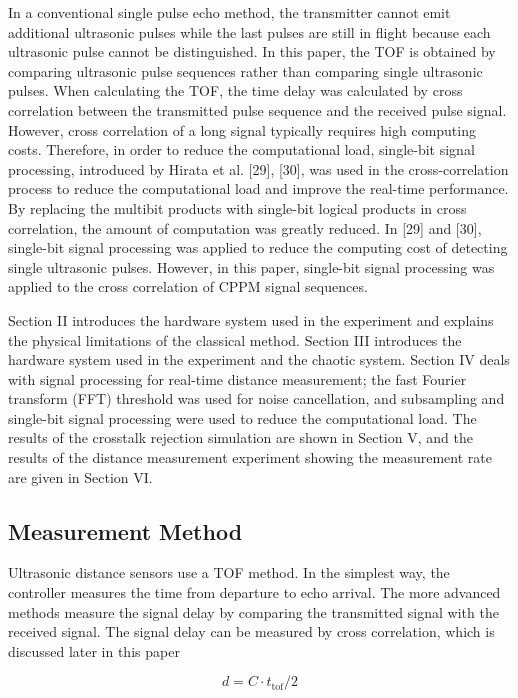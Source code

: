 In a conventional single pulse echo method, the transmitter cannot emit additional ultrasonic pulses while the last pulses are still in flight because each ultrasonic pulse cannot be distinguished. In this paper, the TOF is obtained by comparing ultrasonic pulse sequences rather than comparing single ultrasonic pulses. When calculating the TOF, the time delay was calculated by cross correlation between the transmitted pulse sequence and the received pulse signal. However, cross correlation of a long signal typically requires high computing costs. Therefore, in order to reduce the computational load, single-bit signal processing, introduced by Hirata et al. [29], [30], was used in the cross-correlation process to reduce the computational load and improve the real-time performance. By replacing the multibit products with single-bit logical products in cross correlation, the amount of computation was greatly reduced. In [29] and [30], single-bit signal processing was applied to reduce the computing cost of detecting single ultrasonic pulses. However, in this paper, single-bit signal processing was applied to the cross correlation of CPPM signal sequences.

Section II introduces the hardware system used in the experiment and explains the physical limitations of the classical method. Section III introduces the hardware system used in the experiment and the chaotic system. Section IV deals with signal processing for real-time distance measurement; the fast Fourier transform (FFT) threshold was used for noise cancellation, and subsampling and single-bit signal processing were used to reduce the computational load. The results of the crosstalk rejection simulation are shown in Section V, and the results of the distance measurement experiment showing the measurement rate are given in Section VI.

\subsection{Measurement Method}
Ultrasonic distance sensors use a TOF method. In the simplest way, the controller measures the time from departure to echo arrival. The more advanced methods measure the signal delay by comparing the transmitted signal with the received signal. The signal delay can be measured by cross correlation, which is discussed later in this paper

\begin{equation*} d = C \cdot t_{\text {tof}}/2 \tag{1}\end{equation*}


